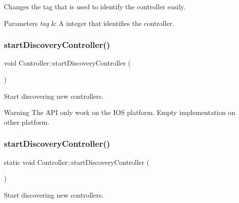 Changes the tag that is used to identify the controller easily. 
\begin{DoxyParams}{Parameters}
{\em tag} & A integer that identifies the controller. \\
\hline
\end{DoxyParams}
\mbox{\label{classController_abd0fe19473c8bcabfe32318c4cc86f1e}} 
\subsubsection{\texorpdfstring{start\+Discovery\+Controller()}{startDiscoveryController()}\hspace{0.1cm}{\footnotesize\ttfamily [1/2]}}
{\footnotesize\ttfamily void Controller\+::start\+Discovery\+Controller (\begin{DoxyParamCaption}{ }\end{DoxyParamCaption})\hspace{0.3cm}{\ttfamily [static]}}

Start discovering new controllers.

\begin{DoxyWarning}{Warning}
The A\+PI only work on the I\+OS platform. Empty implementation on other platform. 
\end{DoxyWarning}
\mbox{\label{classController_aeb4fe47c1de370d6ff5776147839234e}} 
\subsubsection{\texorpdfstring{start\+Discovery\+Controller()}{startDiscoveryController()}\hspace{0.1cm}{\footnotesize\ttfamily [2/2]}}
{\footnotesize\ttfamily static void Controller\+::start\+Discovery\+Controller (\begin{DoxyParamCaption}{ }\end{DoxyParamCaption})\hspace{0.3cm}{\ttfamily [static]}}

Start discovering new controllers.

